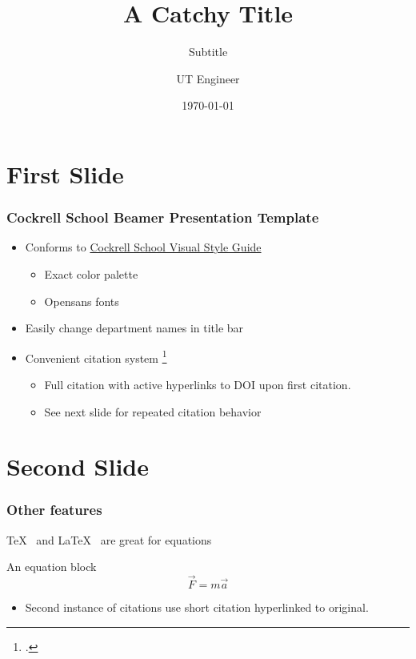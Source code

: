 \documentclass[t, pdftex]{beamer}
\title{A Catchy Title}
\subtitle{Subtitle}
\author{UT Engineer}
\institute{Special Event}
\date{\today}
\begin{document}
\titleframe


\section{First Slide}

\begin{frame}
    \frametitle{Cockrell School Beamer Presentation Template}

    \begin{itemize}
        \item Conforms to \href{http://www.engr.utexas.edu/communications/visualguidelines}{Cockrell School Visual Style Guide}
        \begin{itemize}
            \item Exact color palette
            \item Opensans fonts
        \end{itemize}
        \item Easily change department names in title bar
        \item Convenient citation system \footcite{knuth1989} \cite{lamport1986}
        \begin{itemize}
            \item Full citation with active hyperlinks to DOI upon first citation.
            \item See next slide for repeated citation behavior
        \end{itemize}
    \end{itemize}
\end{frame}

\section{Second Slide}
\begin{frame}[c]
    \frametitle{Other features}
    \TeX\ \cite{knuth1989} and \LaTeX\ \cite{lamport1986} are great for equations
    \begin{block}{An equation block}
        \[ \vec{F} = m \vec{a} \]
    \end{block}
    \begin{itemize}
        \item Second instance of citations use short citation hyperlinked to original.
    \end{itemize}
\end{frame}


\lastframe%
\end{document}
